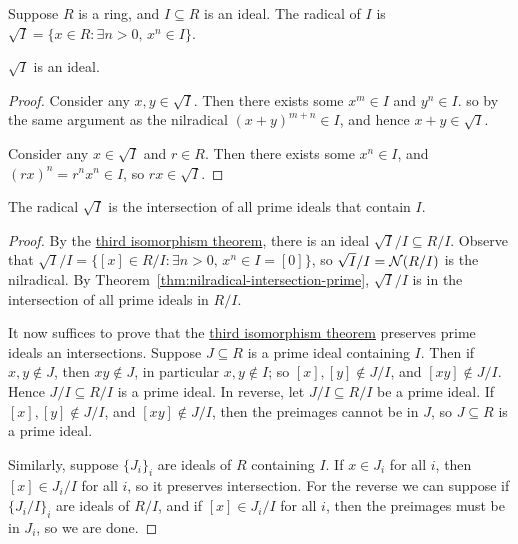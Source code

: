\begin{definition}
    Suppose \(R\) is a ring, and \(I \subseteq R\) is an ideal.
    The radical of \(I\) is \(\sqrt{I} = \{x \in R: \exists n > 0,\, x^n \in I\}\).
\end{definition}
\begin{lemma}
    \(\sqrt{I}\) is an ideal.
\end{lemma}
\begin{proof}
    Consider any \(x,y \in \sqrt{I}\).
    Then there exists some \(x^m \in I\) and \(y^n \in I\).
    so by the same argument as the nilradical \({(x+y)}^{m+n} \in I\),
    and hence \(x+y \in \sqrt{I}\).

    Consider any \(x \in \sqrt{I}\) and \(r \in R\).
    Then there exists some \(x^n \in I\),
    and \({(rx)}^n = r^n x^n \in I\), so \(rx \in \sqrt{I}\).
\end{proof}
\begin{theorem}
    The radical \(\sqrt{I}\) is the intersection of all prime ideals that contain \(I\).
\end{theorem}
\begin{proof}
    By the \hyperref[thm:iso-3-ring]{third isomorphism theorem},
    there is an ideal \(\sqrt{I}/I \subseteq R/I\).
    Observe that \(\sqrt{I}/I = \{[x] \in R/I: \exists n > 0,\, x^n \in I = [0]\}\),
    so \(\sqrt{I}/I = \operatorname{\mathcal{N}}(R/I)\) is the nilradical.
    By Theorem~\ref{thm:nilradical-intersection-prime},
    \(\sqrt{I}/I\) is in the intersection of all prime ideals in \(R/I\).

    It now suffices to prove that
    the \hyperref[thm:iso-3-ring]{third isomorphism theorem}
    preserves prime ideals an intersections.
    Suppose \(J \subseteq R\) is a prime ideal containing \(I\).
    Then if \(x,y \notin J\), then \(xy \notin J\), in particular \(x,y \notin I\);
    so \([x],[y] \notin J/I\), and \([xy] \notin J/I\).
    Hence \(J/I \subseteq R/I\) is a prime ideal.
    In reverse, let \(J/I \subseteq R/I\) be a prime ideal.
    If \([x],[y] \notin J/I\), and \([xy] \notin J/I\),
    then the preimages cannot be in \(J\),
    so \(J \subseteq R\) is a prime ideal.

    Similarly, suppose \({\{J_i\}}_i\) are ideals of \(R\) containing \(I\).
    If \(x \in J_i\) for all \(i\),
    then \([x] \in J_i/I\) for all \(i\),
    so it preserves intersection.
    For the reverse we can suppose if \({\{J_i/I\}}_i\) are ideals of \(R/I\),
    and if \([x] \in J_i/I\) for all \(i\),
    then the preimages must be in \(J_i\),
    so we are done.
\end{proof}

